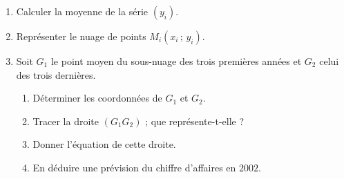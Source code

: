 \begin{annales}
\begin{enumerate}[label=\textbf{\arabic*)}, leftmargin=*, itemsep=0.15em]
  \item Calculer la moyenne de la série $\left(y_{i}\right)$.
  \item Représenter le nuage de points $M_{i}\left(x_{i}\,;\,y_{i}\right)$.
  \item Soit $G_{1}$ le point moyen du sous-nuage des trois premières
        années et $G_{2}$ celui des trois dernières.
        \begin{enumerate}[label=\textbf{\alph*)}, leftmargin=1.4em]
          \item Déterminer les coordonnées de $G_{1}$ et $G_{2}$.
          \item Tracer la droite $\left(G_{1}G_{2}\right)$ ; que
                représente-t-elle ?
          \item Donner l'équation de cette droite.
          \item En déduire une prévision du chiffre d'affaires en $2002$.
        \end{enumerate}
\end{enumerate}
\end{annales}

